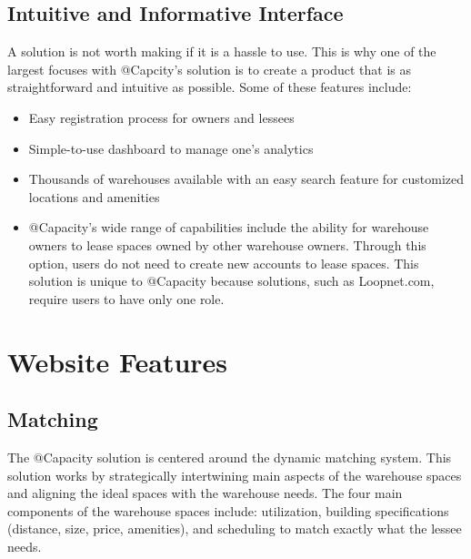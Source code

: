 \subsection{Intuitive and Informative Interface}
A solution is not worth making if it is a hassle to use. This is why one of the largest focuses with @Capcity's solution is to create a product that is as straightforward and intuitive as possible. Some of these features include:
\begin{itemize}
\item Easy registration process for owners and lessees
\item Simple-to-use dashboard to manage one's analytics
\item Thousands of warehouses available with an easy search feature for customized locations and amenities
\item @Capacity's wide range of capabilities include the ability for warehouse owners to lease spaces owned by other warehouse owners.  Through this option, users do not need to create new accounts to lease spaces.  This solution is unique to @Capacity because solutions, such as Loopnet.com, require users to have only one role.
\end{itemize}

\section{Website Features}
\subsection{Matching}
The @Capacity solution is centered around the dynamic matching system. This solution works by strategically intertwining main aspects of the warehouse spaces and aligning the ideal spaces with the warehouse needs. The four main components of the warehouse spaces include: utilization, building specifications (distance, size, price, amenities), and scheduling to match exactly what the lessee needs. 

